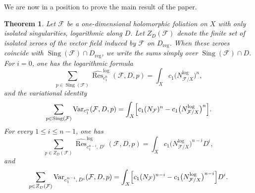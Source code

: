 \documentclass[12pt,reqno,a4paper]{amsart}
\numberwithin{equation}{section}
\theoremstyle{plain}
\newtheorem{theorem}{Theorem}[section]
\theoremstyle{definition}
\DeclareMathOperator{\Sing}{Sing}
\newcommand{\cF}{\mathcal{F}}
\begin{document}
We are now in a position to prove the main result of the paper.

\begin{theorem}\label{thm:residues}
Let \(\cF\) be a one-dimensional holomorphic foliation on \(X\) with only
isolated singularities, logarithmic along \(D\). Let \(Z_D(\cF)\) denote the
finite set of isolated zeroes of the vector field induced by \(\cF\) on
\(D_{\mathrm{reg}}\). When these zeroes coincide with
\(\Sing(\cF)\cap D_{\mathrm{reg}}\), we write the sums simply over
\(\Sing(\cF)\cap D\).
For \(i=0\), one has the logarithmic formula
\[
\sum_{p\in \Sing(\cF)}
\widehat{\operatorname{Res}}^{\log}_{c_1^n}(\cF,D,p)
=
\int_X c_1\bigl(N^{\log}_{\cF/X}\bigr)^n,
\]
and the variational identity
\[
\sum_{p\in \Sing(\cF)}
\operatorname{Var}_{c_1^n}(\cF,D,p)
=
\int_X
\Bigl[
c_1(N_{\cF})^n
-
c_1\bigl(N^{\log}_{\cF/X}\bigr)^n
\Bigr].
\]
For every \(1\leq i\leq n-1\), one has
\[
\sum_{p\in Z_D(\cF)}
\widehat{\operatorname{Res}}^{\log}_{c_1^{n-i},\,D^i}
(\cF,D,p)
=
\int_X c_1\bigl(N^{\log}_{\cF/X}\bigr)^{n-i}D^i,
\]
and
\[
\sum_{p\in Z_D(\cF)}
\operatorname{Var}_{c_1^{n-i},\,D^i}
(\cF,D,p)
=
\int_X
\Bigl[
c_1(N_{\cF})^{n-i}
-
c_1\bigl(N^{\log}_{\cF/X}\bigr)^{n-i}
\Bigr]D^i.
\]
\end{theorem}
\end{document}
